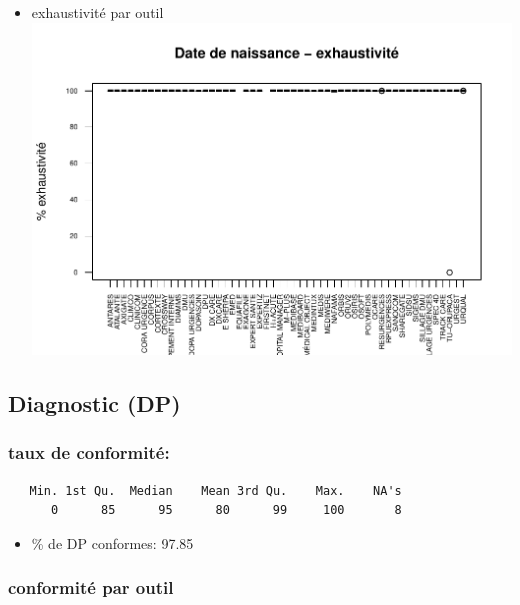 \documentclass[]{article}
\providecommand{\tightlist}{%
  \setlength{\itemsep}{0pt}\setlength{\parskip}{0pt}}
\begin{document}
\begin{itemize}
\tightlist
\item
  exhaustivité par outil
  \includegraphics{septembre2015_files/figure-latex/unnamed-chunk-22-1.pdf}
\end{itemize}

\subsection{Diagnostic (DP)}\label{diagnostic-dp}

\subsubsection{taux de conformité:}\label{taux-de-conformite}

\begin{verbatim}
   Min. 1st Qu.  Median    Mean 3rd Qu.    Max.    NA's 
      0      85      95      80      99     100       8 
\end{verbatim}

\begin{itemize}
\tightlist
\item
  \% de DP conformes: 97.85
\end{itemize}

\subsubsection{conformité par outil}\label{conformite-par-outil}
\end{document}
